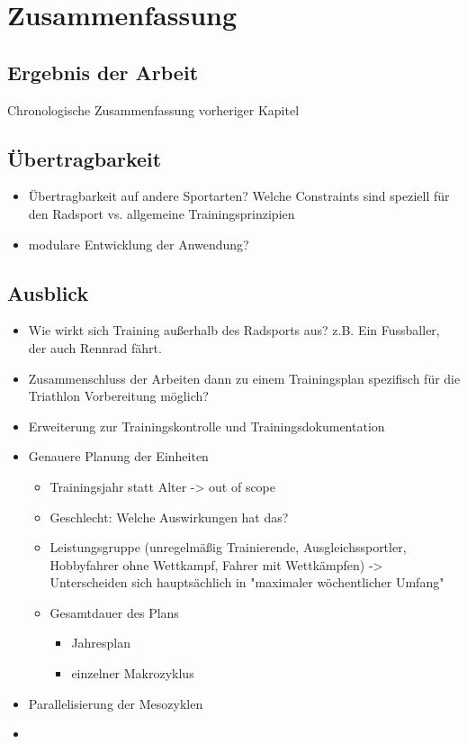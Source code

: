 \chapter{Zusammenfassung}
\label{sec:zusammenfassung}
\section{Ergebnis der Arbeit}
\label{sec:zusammenfassung:ergebnis}
Chronologische Zusammenfassung vorheriger Kapitel

\section{Übertragbarkeit}
\begin{itemize}
    \item Übertragbarkeit auf andere Sportarten? Welche Constraints sind speziell für den Radsport vs. allgemeine Trainingsprinzipien
    \item modulare Entwicklung der Anwendung?
\end{itemize}

\section{Ausblick}
\label{sec:zusammenfassung:ausblick}
\begin{itemize}
    \item Wie wirkt sich Training außerhalb des Radsports aus? z.B. Ein Fussballer, der auch Rennrad fährt.
    \item Zusammenschluss der Arbeiten dann zu einem Trainingsplan spezifisch für die Triathlon Vorbereitung möglich?
    \item Erweiterung zur Trainingskontrolle und Trainingsdokumentation
    \item Genauere Planung der Einheiten
    \begin{itemize}
        \item Trainingsjahr statt Alter -> out of scope \cite[181]{EinfuerungTrainingswissenschaft}
        \item Geschlecht: Welche Auswirkungen hat das?
        \item Leistungsgruppe \cite[S. 173]{Radsporttraining} (unregelmäßig Trainierende, Ausgleichssportler, Hobbyfahrer ohne Wettkampf, Fahrer mit Wettkämpfen) -> Unterscheiden sich hauptsächlich in "maximaler wöchentlicher Umfang"
        \item Gesamtdauer des Plans
            \begin{itemize}
                \item Jahresplan
                \item einzelner Makrozyklus
            \end{itemize}
    \end{itemize}   
    \item Parallelisierung der Mesozyklen
    \item {}
\end{itemize}

